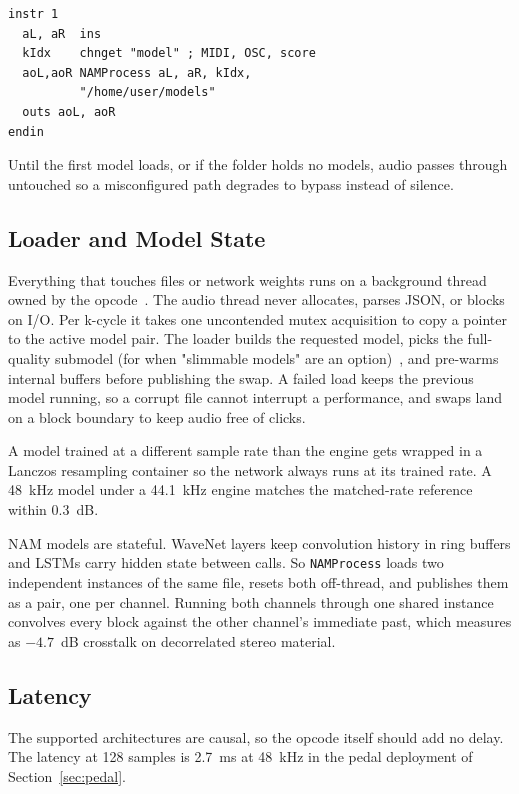 \documentclass[runningheads,a4paper]{llncs}
\begin{document}
\begin{verbatim}
instr 1
  aL, aR  ins
  kIdx    chnget "model" ; MIDI, OSC, score
  aoL,aoR NAMProcess aL, aR, kIdx,
          "/home/user/models"
  outs aoL, aoR
endin
\end{verbatim}

Until the first model loads, or if the folder holds no models, audio
passes through untouched so a misconfigured path degrades to bypass instead of silence.

\subsection{Loader and Model State}
\label{sec:loader}

Everything that touches files or network weights runs on a background
thread owned by the opcode~\cite{bencina2011realtime}. The audio thread never
allocates, parses JSON, or blocks on I/O. Per k-cycle it takes one
uncontended mutex acquisition to copy a pointer to the active model
pair. The loader builds the requested model, picks the full-quality
submodel (for when "slimmable models" are an option)~\cite{atkinson2025slimmable}, and
pre-warms internal buffers before publishing the swap. A failed load
keeps the previous model running, so a corrupt file cannot interrupt a performance, and swaps land on a block boundary to keep audio free of clicks.

A model trained at a different sample rate than the engine gets wrapped
in a Lanczos resampling container so the network always runs at its trained rate. A 48~kHz
model under a 44.1~kHz engine matches the matched-rate reference within 0.3~dB. 

NAM models are stateful. WaveNet layers keep convolution history in ring buffers and LSTMs carry hidden state between calls. So
\texttt{NAMProcess} loads two independent instances of the same file,
resets both off-thread, and publishes them as a pair, one per channel. Running both channels through one shared instance convolves every block against the other channel's immediate past, which measures as $-4.7$~dB crosstalk on decorrelated stereo material.

\subsection{Latency}
\label{sec:latency}

The supported architectures are causal, so the opcode itself should add
no delay. The latency at 128
samples is 2.7~ms at 48~kHz in the pedal deployment of
Section~\ref{sec:pedal}.
\end{document}
